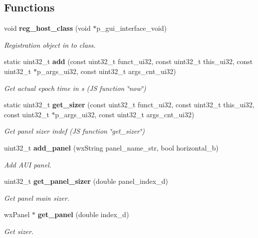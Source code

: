 \subsection*{Functions}
\begin{DoxyCompactItemize}
\item 
void \textbf{ reg\+\_\+host\+\_\+class} (void $\ast$p\+\_\+gui\+\_\+interface\+\_\+void)
\begin{DoxyCompactList}\small\item\em Registration object in to class. \end{DoxyCompactList}\item 
static uint32\+\_\+t \textbf{ add} (const uint32\+\_\+t funct\+\_\+ui32, const uint32\+\_\+t this\+\_\+ui32, const uint32\+\_\+t $\ast$p\+\_\+args\+\_\+ui32, const uint32\+\_\+t args\+\_\+cnt\+\_\+ui32)
\begin{DoxyCompactList}\small\item\em Get actual epoch time in s (JS function \char`\"{}now\char`\"{}) \end{DoxyCompactList}\item 
static uint32\+\_\+t \textbf{ get\+\_\+sizer} (const uint32\+\_\+t funct\+\_\+ui32, const uint32\+\_\+t this\+\_\+ui32, const uint32\+\_\+t $\ast$p\+\_\+args\+\_\+ui32, const uint32\+\_\+t args\+\_\+cnt\+\_\+ui32)
\begin{DoxyCompactList}\small\item\em Get panel sizer indef (JS function \char`\"{}get\+\_\+sizer\char`\"{}) \end{DoxyCompactList}\item 
uint32\+\_\+t \textbf{ add\+\_\+panel} (wx\+String panel\+\_\+name\+\_\+str, bool horizontal\+\_\+b)
\begin{DoxyCompactList}\small\item\em Add A\+UI panel. \end{DoxyCompactList}\item 
uint32\+\_\+t \textbf{ get\+\_\+panel\+\_\+sizer} (double panel\+\_\+index\+\_\+d)
\begin{DoxyCompactList}\small\item\em Get panel main sizer. \end{DoxyCompactList}\item 
wx\+Panel $\ast$ \textbf{ get\+\_\+panel} (double index\+\_\+d)
\begin{DoxyCompactList}\small\item\em Get sizer. \end{DoxyCompactList}\end{DoxyCompactItemize}
